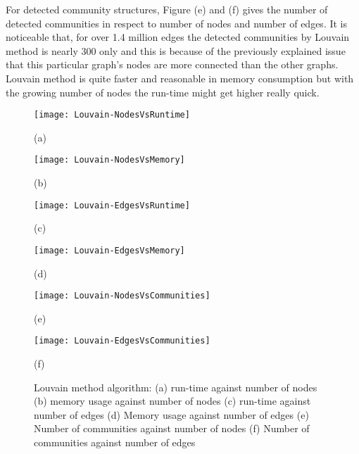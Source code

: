 For detected community structures, Figure (e) and (f) gives the number of detected communities in respect to number of nodes and number of edges. It is noticeable that, for over 1.4 million edges the detected communities by Louvain method is nearly 300 only and this is because of the  previously explained issue that this particular graph's nodes are more connected than the other graphs. Louvain method is quite faster and reasonable in memory consumption but with the growing number of nodes the run-time might get higher really quick.

\vfill
\pagebreak

\begin{figure}[H]
  \centering
  \begin{minipage}[b]{0.4\textwidth}
    \texttt{[image: Louvain-NodesVsRuntime]}
    \caption*{(a)}
  \end{minipage}
  \begin{minipage}[b]{0.4\textwidth}
    \texttt{[image: Louvain-NodesVsMemory]}
    \caption*{(b)}
  \end{minipage}
%
  \begin{minipage}[b]{0.4\textwidth}
    \texttt{[image: Louvain-EdgesVsRuntime]}
    \caption*{(c)}
  \end{minipage}
  \begin{minipage}[b]{0.4\textwidth}
    \texttt{[image: Louvain-EdgesVsMemory]}
    \caption*{(d)}
  \end{minipage}
%
  \begin{minipage}[b]{0.4\textwidth}
    \texttt{[image: Louvain-NodesVsCommunities]}
    \caption*{(e)}
  \end{minipage}
  \begin{minipage}[b]{0.4\textwidth}
    \texttt{[image: Louvain-EdgesVsCommunities]}
    \caption*{(f)}
  \end{minipage}
  \caption{Louvain method algorithm: (a) run-time against number of nodes (b) memory usage against number of nodes (c) run-time against number of edges (d) Memory usage against number of edges (e) Number of communities against number of nodes (f) Number of communities against number of edges}
  \label{fig:louvain-runs}
\end{figure}

